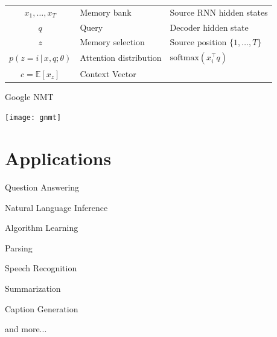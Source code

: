 \documentclass{beamer}
\let\tempone\itemize
\let\temptwo\enditemize
\renewenvironment{itemize}{\tempone\addtolength{\itemsep}{0.5\baselineskip}}{\temptwo}
\newcommand{\softmax}{\mathrm{softmax}}
\newcommand{\given}{\,|\,}
\begin{document}
\begin{frame}
  \begin{center}
  \end{center}

  \begin{center}
    \begin{tabular}{cll}
      $x_1, \ldots, x_T$ & Memory bank& Source RNN hidden states \\
      $q$& Query &Decoder hidden state \\
      $z$& Memory selection & Source position $\{1, \dots, T\}$ \\
      $p(z=i \given x, q; \theta)$ & Attention distribution & $\softmax (x_i^\top q)$  \\ 
    $c  =\mathbb{E} [x_z]  $ & Context Vector & \\
    \end{tabular}    
  \end{center}

\end{frame}



\begin{frame}{Google NMT}
  \begin{center}
    \texttt{[image: gnmt]}
  \end{center}
\end{frame}

\section{Applications}

\begin{frame}{}
  \begin{center}
  \end{center}


  \begin{itemize}
  \item {}
    \vspace{0.5cm}

  \item Question Answering 
  \item Natural Language Inference 
  \item Algorithm Learning
  \item Parsing 
  \item Speech Recognition 
  \item Summarization 
  \item Caption Generation
  \item and more... 
  \end{itemize}
  
\end{frame}
\end{document}
